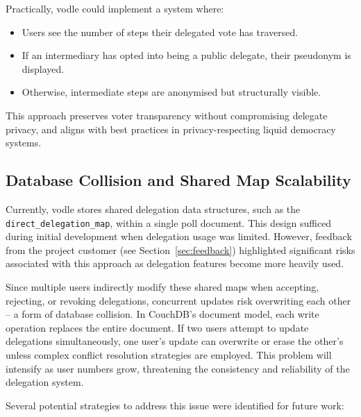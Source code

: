 Practically, vodle could implement a system where:
\begin{itemize}
    \item Users see the number of steps their delegated vote has traversed.
    \item If an intermediary has opted into being a public delegate, their pseudonym is displayed.
    \item Otherwise, intermediate steps are anonymised but structurally visible.
\end{itemize}

This approach preserves voter transparency without compromising delegate privacy, and aligns with best practices in privacy-respecting liquid democracy systems.

\subsection{Database Collision and Shared Map Scalability}

Currently, vodle stores shared delegation data structures, such as the \texttt{direct\_delegation\_map}, within a single poll document. This design sufficed during initial development when delegation usage was limited. However, feedback from the project customer (see Section~\ref{sec:feedback}) highlighted significant risks associated with this approach as delegation features become more heavily used.

Since multiple users indirectly modify these shared maps when accepting, rejecting, or revoking delegations, concurrent updates risk overwriting each other -- a form of database collision. In CouchDB's document model, each write operation replaces the entire document. If two users attempt to update delegations simultaneously, one user's update can overwrite or erase the other's unless complex conflict resolution strategies are employed. This problem will intensify as user numbers grow, threatening the consistency and reliability of the delegation system.

Several potential strategies to address this issue were identified for future work:


